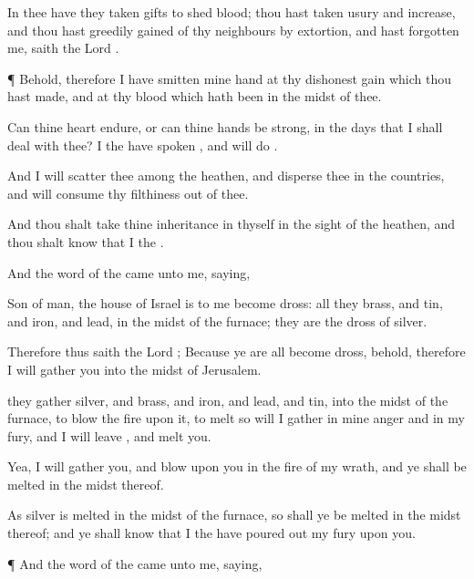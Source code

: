 {In thee have they
taken
gifts to
shed
blood; thou hast
taken
usury and
increase, and thou hast greedily
gained of thy
neighbours by
extortion, and hast
forgotten me,
saith the
Lord
{}.


\par }{\PP {}¶ Behold, therefore I have
smitten mine
hand at thy dishonest
gain which thou hast
made, and at thy
blood which hath been in the
midst of thee.

Can thine
heart
endure, or can thine
hands be
strong, in the
days that I shall
deal with thee? I the
{} have
spoken
{}, and will
do
{}.

And I will
scatter thee among the
heathen, and
disperse thee in the
countries, and will
consume thy
filthiness out of thee.

And thou shalt take thine
inheritance in thyself in the
sight of the
heathen, and thou shalt
know that I
{} the
{}.


\par }{\PP {}And the
word of the
{} came unto me,
saying,

Son of
man, the
house of
Israel is to me become
dross: all they
{}
brass, and
tin, and
iron, and
lead, in the
midst of the
furnace; they are
{} the
dross of
silver.

Therefore thus
saith the
Lord
{}; Because ye are all become
dross, behold, therefore I will
gather you into the
midst of
Jerusalem.

 they
gather
silver, and
brass, and
iron, and
lead, and
tin, into the
midst of the
furnace, to
blow the
fire upon it, to
melt
{} so will I
gather
{} in mine
anger and in my
fury, and I will
leave
{}, and
melt you.

Yea, I will
gather you, and
blow upon you in the
fire of my
wrath, and ye shall be
melted in the
midst thereof.

As
silver is
melted in the
midst of the
furnace, so shall ye be
melted in the
midst thereof; and ye shall
know that I the
{} have poured
out my
fury upon you.


\par }{\PP {}¶ And the
word of the
{} came unto me,
saying,

}
